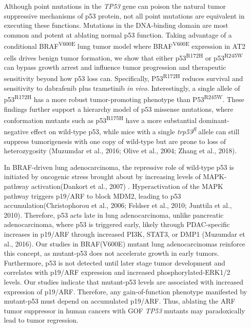 Although point mutations in the \emph{TP53} gene can poison the natural tumor suppressive mechanisms of p53 protein, not all point mutations are equivalent in executing these functions. Mutations in the DNA-binding domain are most common and potent at ablating normal p53 function. Taking advantage of a conditional BRAF\textsuperscript{V600E} lung tumor model where BRAF\textsuperscript{V600E} expression in AT2 cells drives benign tumor formation, we show that either p53\textsuperscript{R172H} or p53\textsuperscript{R245W} can bypass growth arrest and influence tumor progression and therapeutic sensitivity beyond how p53 loss can. Specifically, P53\textsuperscript{R172H} reduces survival and sensitivity to dabrafenib plus trametinib \emph{in vivo}. Interestingly, a single allele of p53\textsuperscript{R172H} has a more robust tumor-promoting phenotype than P53\textsuperscript{R245W}. These findings further support a hierarchy model of p53 missense mutations, where conformation mutants such as p53\textsuperscript{R175H} have a more substantial dominant-negative effect on wild-type p53, while mice with a single \emph{trp53\textsuperscript{fl}} allele can still suppress tumorigenesis with one copy of wild-type but are prone to loss of heterozygosity (Muzumdar et al., 2016; Olive et al., 2004; Zhang et al., 2018).

In BRAF-driven lung adenocarcinoma, the repressive role of wild-type p53 is initiated by oncogenic stress brought about by increasing levels of MAPK-pathway activation(Dankort et al., 2007) . Hyperactivation of the MAPK pathway triggers p19/ARF to block MDM2, leading to p53 accumulation(Christophorou et al., 2006; Feldser et al., 2010; Junttila et al., 2010). Therefore, p53 acts late in lung adenocarcinoma, unlike pancreatic adenocarcinoma, where p53 is triggered early, likely through PDAC-specific increases in p19/ARF through increased PI3K, STAT3, or DMP1 (Muzumdar et al., 2016). Our studies in BRAF(V600E) mutant lung adenocarcinomas reinforce this concept, as mutant-p53 does not accelerate growth in early tumors. Furthermore, p53 is not detected until later stage tumor development and correlates with p19/ARF expression and increased phosphorylated-ERK1/2 levels. Our studies indicate that mutant-p53 levels are associated with increased expression of p19/ARF. Therefore, any gain-of-function phenotype manifested by mutant-p53 must depend on accumulated p19/ARF. Thus, ablating the ARF tumor suppressor in human cancers with GOF \emph{TP53} mutants may paradoxically lead to tumor regression.

